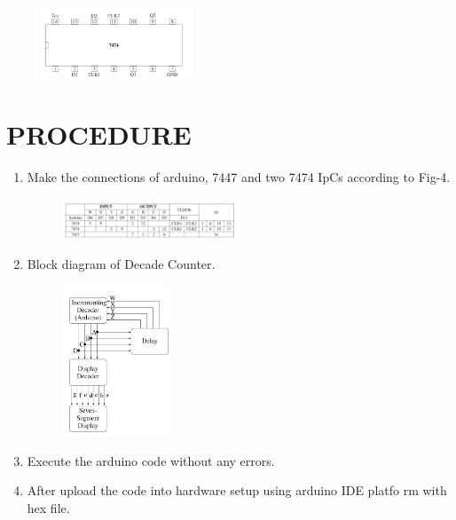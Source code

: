 \documentclass[conference]{IEEEtran}
\begin{document}
\begin{figure}[h]
\centering
\includegraphics[width=0.4\textwidth]{7474.jpg}
\caption{\label{fig-3:Gates}}
\end{figure}
\section{PROCEDURE}


\begin{enumerate}

\item Make the connections of arduino, 7447 and two 7474 IpCs according to Fig-4.
        \begin{figure}[h]
        \centering
		\includegraphics[width=0.5\textwidth]{connections.jpg}
        \caption{\label{fig-4:Gates}}
\end{figure}

\item Block diagram of Decade Counter.
                                                                        \begin{figure}[h]
\centering
\includegraphics[width=0.3\textwidth]{decoder.jpg}
\caption{\label{fig-5:Gates}}
\end{figure}
                                                                        

\item Execute the arduino code without any errors.
\item After upload the code into hardware setup using arduino IDE platfo
rm with hex file.
 \end{enumerate}
\end{document}
